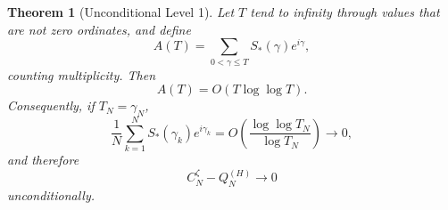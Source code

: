 \documentclass[11pt]{amsart}
\numberwithin{equation}{section}
\newtheorem{theorem}{Theorem}[section]
\theoremstyle{definition}
\theoremstyle{remark}
\begin{document}
\begin{theorem}[Unconditional Level 1]\label{thm:level1}
Let $T$ tend to infinity through values that are not zero ordinates, and define
\[
A(T)=\sum_{0<\gamma\le T}S_*(\gamma)e^{i\gamma},
\]
counting multiplicity.  Then
\begin{equation}\label{eq:ATbound}
A(T)=O(T\log\log T).
\end{equation}
Consequently, if $T_N=\gamma_N$,
\begin{equation}\label{eq:level1rate}
\boxed{
\frac1N\sum_{k=1}^N S_*(\gamma_k)e^{i\gamma_k}
=O\!\left(\frac{\log\log T_N}{\log T_N}\right)\longrightarrow0,
}
\end{equation}
and therefore
\begin{equation}\label{eq:CQlimit}
\boxed{C_N^{\zeta}-Q_N^{(H)}\longrightarrow0}
\end{equation}
unconditionally.
\end{theorem}
\end{document}
